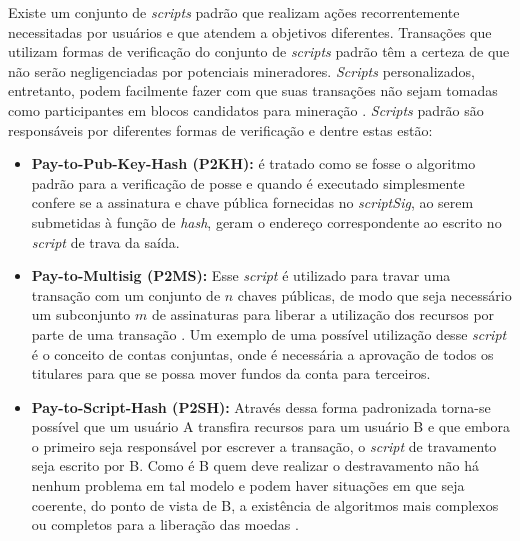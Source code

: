 %
Existe um conjunto de \textit{scripts} padrão que realizam ações recorrentemente necessitadas por usuários e que atendem a objetivos diferentes. Transações que utilizam formas de verificação do conjunto de \textit{scripts} padrão têm a certeza de que não serão negligenciadas por potenciais mineradores. \textit{Scripts} personalizados, entretanto, podem facilmente fazer com que suas transações não sejam tomadas como participantes em blocos candidatos para mineração \cite{blockchain:mastering_bitcoin}. \textit{Scripts} padrão são responsáveis por diferentes formas de verificação e dentre estas estão: 
\begin{itemize}
    \item \textbf{Pay-to-Pub-Key-Hash (P2KH):} é tratado como se fosse o algoritmo padrão para a verificação de posse e quando é executado simplesmente confere se a assinatura e chave pública fornecidas no \textit{scriptSig}, ao serem submetidas à função de \textit{hash}, geram o endereço correspondente ao escrito no \textit{script} de trava da saída.
    \item \textbf{Pay-to-Multisig (P2MS):} Esse \textit{script} é utilizado para travar uma transação com um conjunto de $n$ chaves públicas, de modo que seja necessário um subconjunto $m$ de assinaturas para liberar a utilização dos recursos por parte de uma transação \cite{blockchain:mastering_bitcoin}. Um exemplo de uma possível utilização desse \textit{script} é o conceito de contas conjuntas, onde é necessária a aprovação de todos os titulares para que se possa mover fundos da conta para terceiros.
    \item \textbf{Pay-to-Script-Hash (P2SH):} Através dessa forma padronizada torna-se possível que um usuário A transfira recursos para um usuário B e que embora o primeiro seja responsável por escrever a transação, o \textit{script} de travamento seja escrito por B. Como é B quem deve realizar o destravamento não há nenhum problema em tal modelo e podem haver situações em que seja coerente, do ponto de vista de B, a existência de algoritmos mais complexos ou completos para a liberação das moedas \cite{smart_contracts:learn_me_a_bitcoin}.

\end{itemize}

